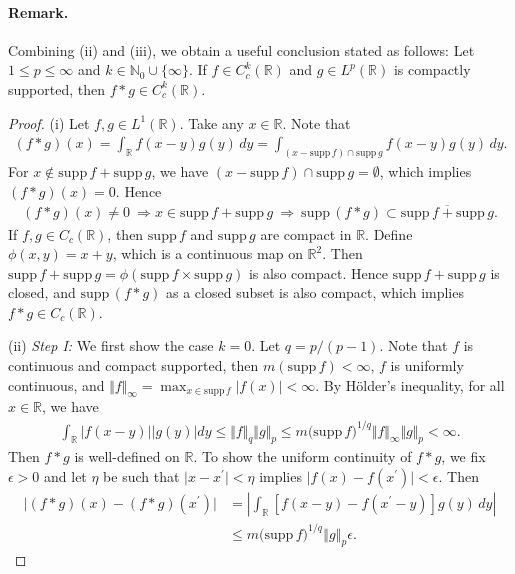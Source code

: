 \documentclass{article}
\newcommand{\supp}{\mathrm{supp}\,}
\renewcommand{\proofname}{\textit{Proof}}
\begin{document}
\paragraph{Remark.} Combining (ii) and (iii), we obtain a useful conclusion stated as follows: Let $1\leq p\leq \infty$ and $k\in\mathbb{N}_0\cup\{\infty\}$. If $f\in C_c^k(\mathbb{R})$ and $g\in L^p(\mathbb{R})$ is compactly supported, then $f*g\in C_c^k(\mathbb{R})$.
\renewcommand{\proofname}{Proof of Proposition 1.46}
\begin{proof}
(i) Let $f,g\in L^1(\mathbb{R})$. Take any $x\in\mathbb{R}$. Note that
\begin{align*}
	(f*g)(x) = \int_\mathbb{R} f(x-y)g(y)\,dy = \int_{(x-\supp f)\cap \supp g}f(x-y)g(y)\,dy.
\end{align*}
For $x\notin \supp f + \supp g$, we have $(x-\supp f)\cap \supp g=\emptyset$, which implies $(f*g)(x) = 0$. Hence
\begin{align*}
	(f*g)(x)\neq 0\ \Rightarrow x\in \supp f + \supp g\ \Rightarrow\ \supp(f*g)\subset\overline{\supp f + \supp g}.
\end{align*}
If $f,g\in C_c(\mathbb{R})$, then $\supp f$ and $\supp g$ are compact in $\mathbb{R}$. Define $\phi(x,y)=x+y$, which is a continuous map on $\mathbb{R}^2$. Then $\supp f + \supp g = \phi(\supp f\times\supp g)$ is also compact. Hence $\supp f + \supp g$ is closed, and $\supp (f*g)$ as a closed subset is also compact, which implies $f*g\in C_c(\mathbb{R})$.
\vspace{0.1cm}

(ii) \textit{Step I:} We first show the case $k=0$. Let $q=p/(p-1)$. Note that $f$ is continuous and compact supported, then $m(\supp f) < \infty$, $f$ is uniformly continuous, and $\Vert f\Vert_\infty = \max_{x\in\supp f}\vert f(x)\vert < \infty$. By Hölder's inequality, for all $x\in\mathbb{R}$, we have
\begin{align*}
	\int_\mathbb{R}\left\vert f(x-y)\right\vert\left\vert g(y)\right\vert dy \leq \Vert f\Vert_q\Vert g\Vert_p \leq m\bigl(\supp f\bigr)^{1/q}\Vert f\Vert_\infty\Vert g\Vert_p < \infty.
\end{align*}
Then $f*g$ is well-defined on $\mathbb{R}$. To show the uniform continuity of $f*g$, we fix $\epsilon>0$ and let $\eta$ be such that $\vert x-x^\prime\vert<\eta$ implies $\vert f(x)-f(x^\prime)\vert < \epsilon$. Then
\begin{align*}
	\vert(f*g)(x) - (f*g)(x^\prime)\vert &= \left\vert\int_\mathbb{R} \left[f(x-y) - f(x^\prime-y)\right]g(y)\,dy\right\vert\\
	&\leq m\bigl(\supp f\bigr)^{1/q}\left\Vert g\right\Vert_p\epsilon.
\end{align*}


\end{proof}
\end{document}
